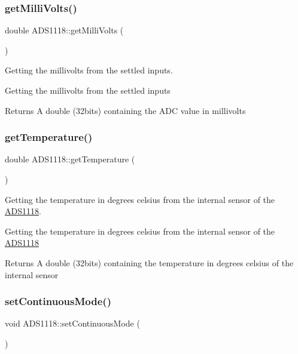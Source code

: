 \subsubsection{\texorpdfstring{get\+Milli\+Volts()}{getMilliVolts()}\hspace{0.1cm}{\footnotesize\ttfamily [2/2]}}
{\footnotesize\ttfamily double A\+D\+S1118\+::get\+Milli\+Volts (\begin{DoxyParamCaption}{ }\end{DoxyParamCaption})}



Getting the millivolts from the settled inputs. 

Getting the millivolts from the settled inputs \begin{DoxyReturn}{Returns}
A double (32bits) containing the A\+DC value in millivolts 
\end{DoxyReturn}
\mbox{\label{class_a_d_s1118_acf67a3c09b9d165f04e2e37e618e4fcb}} 
\subsubsection{\texorpdfstring{get\+Temperature()}{getTemperature()}}
{\footnotesize\ttfamily double A\+D\+S1118\+::get\+Temperature (\begin{DoxyParamCaption}{ }\end{DoxyParamCaption})}



Getting the temperature in degrees celsius from the internal sensor of the \mbox{\hyperlink{class_a_d_s1118}{A\+D\+S1118}}. 

Getting the temperature in degrees celsius from the internal sensor of the \mbox{\hyperlink{class_a_d_s1118}{A\+D\+S1118}} \begin{DoxyReturn}{Returns}
A double (32bits) containing the temperature in degrees celsius of the internal sensor 
\end{DoxyReturn}
\mbox{\label{class_a_d_s1118_af739fb00547d7a5df8c5010c40b64c6a}} 
\subsubsection{\texorpdfstring{set\+Continuous\+Mode()}{setContinuousMode()}}
{\footnotesize\ttfamily void A\+D\+S1118\+::set\+Continuous\+Mode (\begin{DoxyParamCaption}{ }\end{DoxyParamCaption})}



